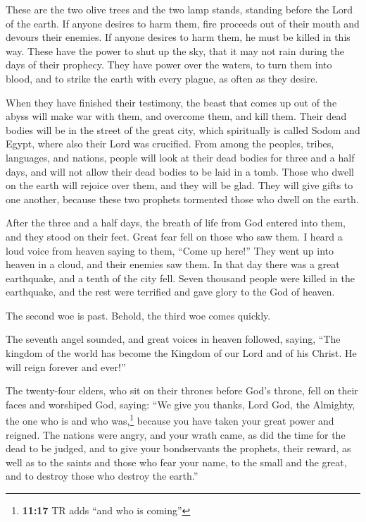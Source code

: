  These are the two olive trees and the two lamp stands,
standing before the Lord of the earth.  If anyone desires
to harm them, fire proceeds out of their mouth and devours their
enemies. If anyone desires to harm them, he must be killed in this way.
 These have the power to shut up the sky, that it may not
rain during the days of their prophecy. They have power over the waters,
to turn them into blood, and to strike the earth with every plague, as
often as they desire.

 When they have finished their testimony, the beast that
comes up out of the abyss will make war with them, and overcome them,
and kill them.  Their dead bodies will be in the street of
the great city, which spiritually is called Sodom and Egypt, where also
their Lord was crucified.  From among the peoples, tribes,
languages, and nations, people will look at their dead bodies for three
and a half days, and will not allow their dead bodies to be laid in a
tomb.  Those who dwell on the earth will rejoice over
them, and they will be glad. They will give gifts to one another,
because these two prophets tormented those who dwell on the earth.

 After the three and a half days, the breath of life from
God entered into them, and they stood on their feet. Great fear fell on
those who saw them.  I heard a loud voice from heaven
saying to them, ``Come up here!'' They went up into heaven in a cloud,
and their enemies saw them.  In that day there was a
great earthquake, and a tenth of the city fell. Seven thousand people
were killed in the earthquake, and the rest were terrified and gave
glory to the God of heaven.

 The second woe is past. Behold, the third woe comes
quickly.

 The seventh angel sounded, and great voices in heaven
followed, saying, ``The kingdom of the world has become the Kingdom of
our Lord and of his Christ. He will reign forever and ever!''

 The twenty-four elders, who sit on their thrones before
God's throne, fell on their faces and worshiped God, 
saying: ``We give you thanks, Lord God, the Almighty, the one who is and
who was,\footnote{\textbf{11:17} TR adds ``and who is coming''} because
you have taken your great power and reigned.  The nations
were angry, and your wrath came, as did the time for the dead to be
judged, and to give your bondservants the prophets, their reward, as
well as to the saints and those who fear your name, to the small and the
great, and to destroy those who destroy the earth.''

